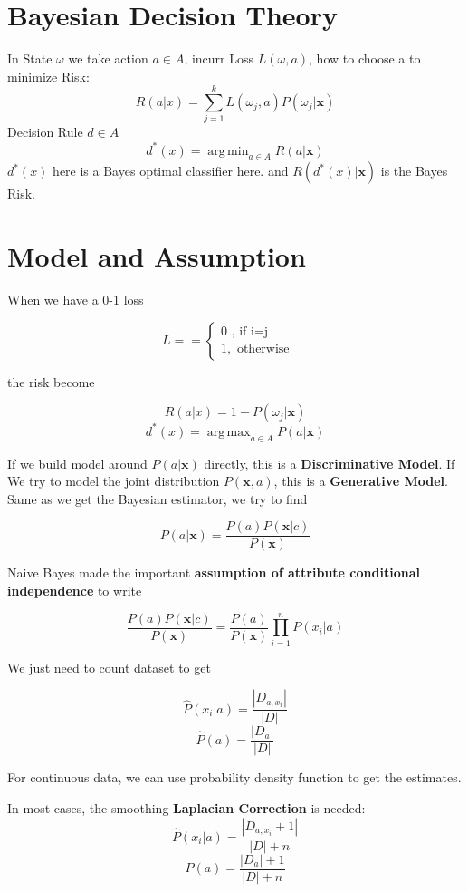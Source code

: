 \documentclass[11pt, openany]{book}              %
\DeclareMathOperator*{\argmax}{arg\,max}  %
\DeclareMathOperator*{\argmin}{arg\,min}  %
\begin{document}
\section{ Bayesian Decision Theory}

In State $\omega$ we take action $a \in A$, incurr Loss $L(\omega,a)$, how to choose a to minimize
Risk:
$$R(a|x) = \sum_{j=1}^k L(\omega_j, a) P(\omega_j |\mathbf{x} )$$
Decision Rule $d \in A$
$$d^*(x) = \argmin_{a \in A} R(a|\mathbf{x})$$
$d^*(x)$ here is a Bayes optimal classifier here. and $R(d^*(x)|\mathbf{x})$ is the Bayes Risk.



\section{Model and Assumption}
When we have a 0-1 loss

$$L = = \left\{
             \begin{array}{lr}
             0 \text{ , if i=j} &  \\
             1, \text{ otherwise } &  
             \end{array}
      \right.$$

the risk become

$$R(a|x) = 1- P(\omega_j |\mathbf{x} )$$
$$d^*(x) = \argmax_{a \in A} P(a|\mathbf{x})$$

If we build model around $P(a|\mathbf{x})$ directly, this is a \textbf{Discriminative Model}. If We try to model the joint distribution $P(\mathbf{x},a)$, this is a \textbf{Generative Model}. Same as we get the Bayesian estimator, we try to find

$$P(a|\mathbf{x}) = \frac{P(a)P(\mathbf{x}|c)}{P(\mathbf{x})}$$

Naive Bayes made the important \textbf{assumption of attribute conditional independence} to write

$$\frac{P(a)P(\mathbf{x}|c)}{P(\mathbf{x})}= \frac{P(a)}{P(\mathbf{x})}\prod_{i=1}^n P(x_i|a)$$

We just need to count dataset to get

$$\hat{P}(x_i|a) = \frac{|D_{a,x_i}|}{|D|}$$
$$\hat{P}(a) = \frac{|D_{a}|}{|D|}$$

For continuous data, we can use probability density function to get the estimates. 

In most cases, the smoothing \textbf{Laplacian Correction} is needed:
$$\hat{P}(x_i|a) = \frac{|D_{a,x_i}+1|}{|D|+n}$$
$$\hat{P}(a) = \frac{|D_{a}|+1}{|D|+n}$$
\end{document}
